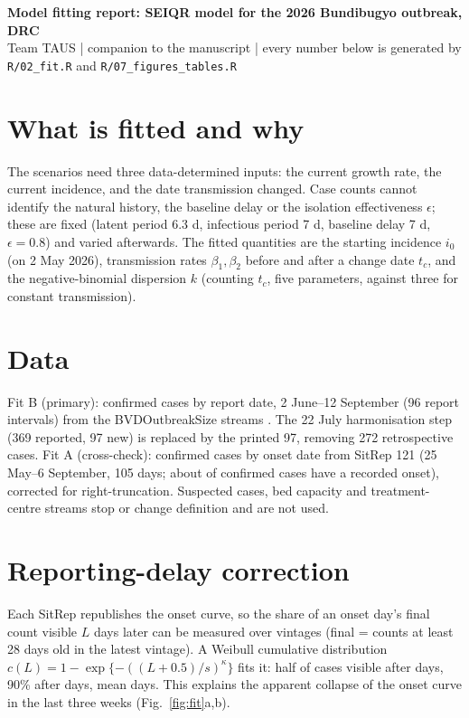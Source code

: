 \documentclass[10pt,a4paper]{article}
\begin{document}
{\Large\bfseries Model fitting report: SEIQR model for the 2026 Bundibugyo outbreak, DRC}\\[3pt]
{\small Team TAUS \;|\; companion to the manuscript \;|\; every number below is generated by \texttt{R/02\_fit.R} and \texttt{R/07\_figures\_tables.R}}

\section{What is fitted and why}
The scenarios need three data-determined inputs: the current growth rate, the current incidence, and the date transmission changed. Case counts cannot identify the natural history, the baseline delay or the isolation effectiveness $\epsilon$; these are fixed (latent period 6.3 d, infectious period 7 d, baseline delay 7 d, $\epsilon=0.8$) and varied afterwards. The fitted quantities are the starting incidence $i_0$ (on 2 May 2026), transmission rates $\beta_1,\beta_2$ before and after a change date $t_c$, and the negative-binomial dispersion $k$ (counting $t_c$, five parameters, against three for constant transmission).

\section{Data}
Fit B (primary): confirmed cases by report date, 2 June--12 September (96 report intervals) from the BVDOutbreakSize streams \citep{bvdoutbreaksize2026}. The 22 July harmonisation step (369 reported, 97 new) is replaced by the printed 97, removing 272 retrospective cases. Fit A (cross-check): confirmed cases by onset date from SitRep 121 (25 May--6 September, 105 days; about \shareOnset{} of confirmed cases have a recorded onset), corrected for right-truncation. Suspected cases, bed capacity and treatment-centre streams stop or change definition and are not used.

\section{Reporting-delay correction}
Each SitRep republishes the onset curve, so the share of an onset day's final count visible $L$ days later can be measured over \nVintages{} vintages (final = counts at least 28 days old in the latest vintage). A Weibull cumulative distribution $c(L)=1-\exp\{-((L+0.5)/s)^\kappa\}$ fits it: half of cases visible after \delayHalf{} days, 90\% after \delayNinety{} days, mean \delayMean{} days. This explains the apparent collapse of the onset curve in the last three weeks (Fig.~\ref{fig:fit}a,b).
\end{document}
